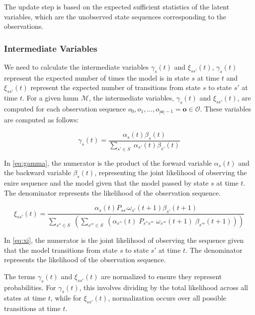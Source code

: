The update step is based on the expected sufficient statistics of the latent variables, which are the unobserved state sequences corresponding to the observations.

\subsubsection{Intermediate Variables}
We need to calculate the intermediate variables $\gamma_s(t)$ and $\xi_{ss'}(t)$, $\gamma_s(t)$ represent the expected number of times the model is in state $s$ at time $t$ and $\xi_{ss'}(t)$ represent the expected number of transitions from state $s$ to state $s'$ at time $t$.
For a given \gls{hmm} $\mathcal{M}$, the intermediate variables, $\gamma_s(t)$ and $\xi_{ss'}(t)$, are computed for each observation sequence $o_0, o_1, \dots, o_{|\mathbf{o}|-1} = \mathbf{o} \in \mathcal{O}$.
These variables are computed as follows:

\begin{equation}
    \gamma_s(t) = \frac{\alpha_s(t) \beta_s(t)}{\sum_{s' \in S} \;\alpha_{s'}(t) \beta_{s'}(t)}
    \label{eq:gamma}
\end{equation}

In \autoref{eq:gamma}, the numerator is the product of the forward variable $\alpha_s(t)$ and the backward variable $\beta_s(t)$, representing the joint likelihood of observing the enire sequence and the model given that the model passed by state $s$ at time $t$.
The denominator represents the likelihood of the observation sequence.

\begin{equation}
    \xi_{ss'}(t) = \frac{\alpha_s(t) P_{ss'} \omega_{s'}(t + 1) \beta_{s'}(t + 1)}
    {\sum_{s'' \in S} \;(\sum_{s''' \in S} \; (\alpha_{s''}(t) \; P_{s''s'''} \; \omega_{s'''}(t + 1) \; \beta_{s'''}(t + 1)))}
    \label{eq:xi}
\end{equation}


In \autoref{eq:xi}, the numerator is the joint likelihood of observing the sequence given that the model transitions from state $s$ to state $s'$ at time $t$.
The denominator represents the likelihood of the observation sequence.


The terms $\gamma_s(t)$ and $\xi_{ss'}(t)$ are normalized to ensure they represent probabilities.
For $\gamma_s(t)$, this involves dividing by the total likelihood across all states at time $t$, while for $\xi_{ss'}(t)$, normalization occurs over all possible transitions at time $t$.


